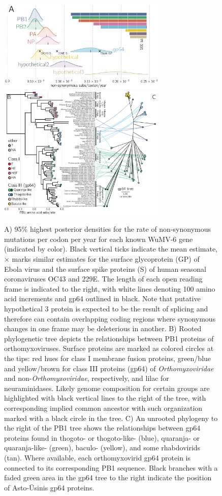 \documentclass[11pt,twocolumn]{article}
\begin{document}
\begin{figure}%
\centering
\includegraphics[width=0.72\textwidth]{Fig2A_nsyn.png}
\includegraphics[width=0.72\textwidth]{Fig2BC_orthomyxos.png}

\caption{
A) 95\% highest posterior densities for the rate of non-synonymous mutations per codon per year for each known WuMV-6 gene (indicated by color).
Black vertical ticks indicate the mean estimate, $\times$ marks similar estimates for the surface glycoprotein (GP) of Ebola virus and the surface spike proteins (S) of human seasonal coronaviruses OC43 and 229E.
The length of each open reading frame is indicated to the right, with white lines denoting 100 amino acid increments and gp64 outlined in black.
Note that putative hypothetical 3 protein is expected to be the result of splicing \citep{batson_single_2021} and therefore can contain overlapping coding regions where synonymous changes in one frame may be deleterious in another.
B) Rooted phylogenetic tree depicts the relationships between PB1 proteins of orthomyxoviruses.
Surface proteins are marked as colored circles at the tips: red hues for class I membrane fusion proteins, green/blue and yellow/brown for class III proteins (gp64) of \textit{Orthomyxoviridae} and non-\textit{Orthomyxoviridae}, respectively, and lilac for neuraminidases.
Likely genome composition for certain groups are highlighted with black vertical lines to the right of the tree, with corresponding implied common ancestor with such organization marked with a black circle in the tree.
C) An unrooted phylogeny to the right of the PB1 tree shows the relationships between gp64 proteins found in thogoto- or thogoto-like- (blue), quaranja- or quaranja-like- (green), baculo- (yellow), and some rhabdovirids (tan).
Where available, each orthomyxovirid gp64 protein is connected to its corresponding PB1 sequence.
Black branches with a faded green area in the gp64 tree to the right indicate the position of Asto-\={U}sinis gp64 proteins.
}
\label{fig:orthomyxos}


\end{figure}
\end{document}
